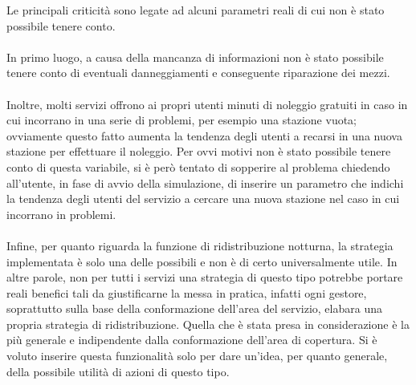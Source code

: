 \documentclass[a4paper, 12pt]{article}
\begin{document}
	Le principali criticità sono legate ad alcuni parametri reali di cui non è stato possibile tenere conto.\\\\
	In primo luogo, a causa della mancanza di informazioni non è stato possibile tenere conto di eventuali danneggiamenti e conseguente riparazione dei mezzi.\\\\
	Inoltre, molti servizi offrono ai propri utenti minuti di noleggio gratuiti in caso in cui incorrano in una serie di problemi, per esempio una stazione vuota; ovviamente questo fatto aumenta la tendenza degli utenti a recarsi in una nuova stazione per effettuare il noleggio. Per ovvi motivi non è stato possibile tenere conto di questa variabile, si è però tentato di sopperire al problema chiedendo all'utente, in fase di avvio della simulazione, di inserire un parametro che indichi la tendenza degli utenti del servizio a cercare una nuova stazione nel caso in cui incorrano in problemi.\\\\
	Infine, per quanto riguarda la funzione di ridistribuzione notturna, la strategia implementata è solo una delle possibili e non è di certo universalmente utile. In altre parole, non per tutti i servizi una strategia di questo tipo potrebbe portare reali benefici tali da giustificarne la messa in pratica, infatti ogni gestore, soprattutto sulla base della conformazione dell'area del servizio, elabara una propria strategia di ridistribuzione. Quella che è stata presa in considerazione è la più generale e indipendente dalla conformazione dell'area di copertura. Si è voluto inserire questa funzionalità solo per dare un'idea, per quanto generale, della possibile utilità di azioni di questo tipo.

\newpage

\end{document}
